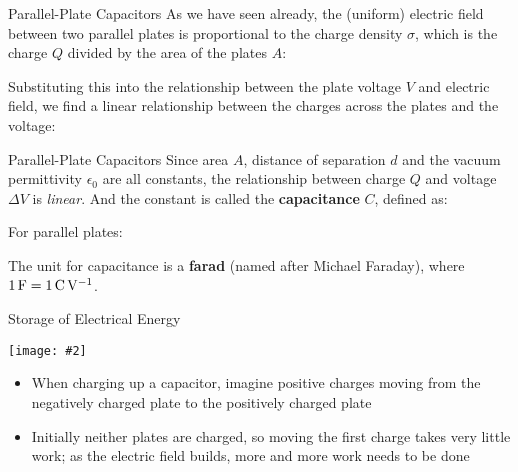 \documentclass[12pt,aspectratio=169]{beamer}
\newcommand{\pic}[2]{\texttt{[image: \#2]}}
\newcommand{\eq}[2]{\vspace{#1}{\Large\begin{displaymath}#2\end{displaymath}}}
\begin{document}
\begin{frame}{Parallel-Plate Capacitors}
  As we have seen already, the (uniform) electric field between two parallel
  plates is proportional to the charge density $\sigma$, which is the charge
  $Q$ divided by the area of the plates $A$:

  \eq{-.2in}{
    E=\frac{\textcolor{red}{\sigma}}{\epsilon_0}=
    \frac{\textcolor{red}{Q}}{\textcolor{red}{A}\epsilon_0}
  }
  
  Substituting this into the relationship between the plate voltage $V$ and
  electric field, we find a linear relationship between the charges across the
  plates and the voltage:

  \eq{-.2in}{
    \Delta V=\textcolor{blue}{E}d=
    \frac{\textcolor{blue}{Q}d}{\textcolor{blue}{A\epsilon_0}}
    \quad\longrightarrow\quad
    \boxed{Q=\left[\frac{A\epsilon_0}d\right]\Delta V}
  }
\end{frame}



\begin{frame}{Parallel-Plate Capacitors}
  Since area $A$, distance of separation $d$ and the vacuum permittivity
  $\epsilon_0$ are all constants, the relationship between charge $Q$ and
  voltage $\Delta V$ is \emph{linear}. And the constant is called the
  \textbf{capacitance} $C$, defined as:

  \eq{-.15in}{
    \boxed{C=\frac{Q}{\Delta V}}
  }

  For parallel plates:

  \eq{-.2in}{
    C=\frac{A\epsilon_0}d
  }

  The unit for capacitance is a \textbf{farad} (named after Michael Faraday),
  where $\SI1\farad=\SI1{\coulomb\per\volt}$.
\end{frame}



\begin{frame}{Storage of Electrical Energy}
  \begin{center}
    \pic{.45}{slide14}
  \end{center}
  \begin{itemize}
  \item When charging up a capacitor, imagine positive charges moving from the
    negatively charged plate to the positively charged plate
  \item Initially neither plates are charged, so moving the first charge takes
    very little work; as the electric field builds, more and more work needs
    to be done
  \end{itemize}
\end{frame}
\end{document}

